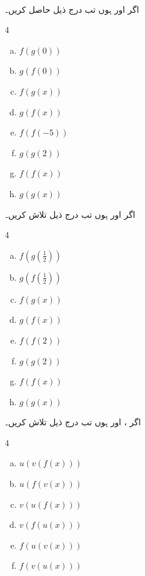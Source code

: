 \\

اگر  اور  ہوں تب درج ذیل حاصل کریں۔
\begin{multicols}{4}
\begin{enumerate}[a.]
\item
$f(g(0))$
\item
$g(f(0))$
\item
$f(g(x))$
\item
$g(f(x))$
\item
$f(f(-5))$
\item
$g(g(2))$
\item
$f(f(x))$
\item
$g(g(x))$
\end{enumerate}
\end{multicols}
اگر  اور  ہوں تب درج ذیل تلاش کریں۔
\begin{multicols}{4}
\begin{enumerate}[a.]
\item
$f(g(\tfrac{1}{2}))$
\item
$g(f(\tfrac{1}{2}))$
\item
$f(g(x))$
\item
$g(f(x))$
\item
$f(f(2))$
\item
$g(g(2))$
\item
$f(f(x))$
\item
$g(g(x))$
\end{enumerate}
\end{multicols}
اگر ،  اور  ہوں تب درج ذیل تلاش کریں۔
\begin{multicols}{4}
\begin{enumerate}[a.]
\item
$u(v(f(x)))$
\item
$u(f(v(x)))$
\item
$v(u(f(x)))$
\item
$v(f(u(x)))$
\item
$f(u(v(x)))$
\item
$f(v(u(x)))$
\end{enumerate}
\end{multicols}
